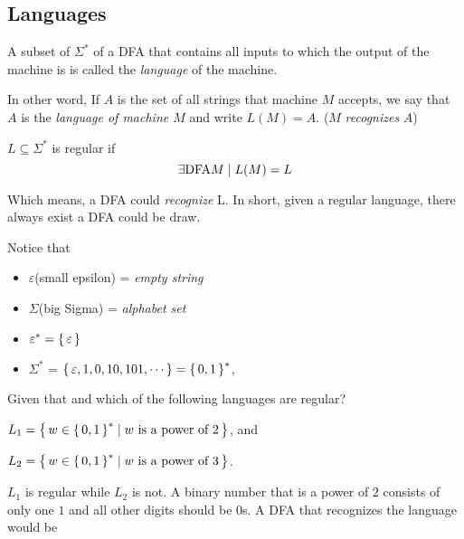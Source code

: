
\subsection{Languages}
A subset of $\Sigma^*$ of a DFA that contains all inputs to which the output of the
machine is \true is called the \emph{language} of the machine.


In other word, If $A$ is the set of all strings that machine $M$ accepts, we say that $A$
is the \emph{ language of machine $M$} and write $L(M) = A$. ($M$ \emph{recognizes} $A$)

\begin{definition}
    $ L \subseteq \Sigma^* $
    is regular if
    \[
        \exists {\text{\upshape DFA} M} \mid L(M) = L
    \]
\end{definition}

Which means, a DFA could \emph{recognize} L. In short, given a regular language, there
always exist a DFA could be draw.

Notice that 
\begin{itemize}
    \item
        $\varepsilon$(small epsilon) = \emph{ empty string } 
    \item
        $\Sigma$(big Sigma)          = \emph{ alphabet set } 
    \item
        $\varepsilon^*               = { \left\{\,\varepsilon\,\right\} }$  
    \item
        $\Sigma^*$                   = ${ \left\{\,\varepsilon,1,0,10,101,\cdots\,\right\} } = { \left\{\,0,1\,\right\} }^*$,
\end{itemize}

\begin{example}
    Given that
    and
    which of the following languages are regular?
    \begin{compactitem}
    \item
        $L_1 = { \left\{\, w \in { \left\{\,0,1\,\right\} }^* \mid w \text{ is a power of } 2\,\right\} }$, and
    \item
        $L_2 = { \left\{\, w \in { \left\{\,0,1\,\right\} }^* \mid w \text{ is a power of } 3\,\right\} }$.
    \end{compactitem}
    
    $L_1$ is regular while $L_2$ is not. A binary number that is a power of $2$ consists
    of only one $1$ and all other digits should be $0$s. A DFA that recognizes the
    language would be

\end{example}


